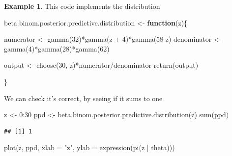 \documentclass[
]{book}
\newenvironment{Shaded}{\begin{snugshade}}{\end{snugshade}}
\newcommand{\AttributeTok}[1]{\textcolor[rgb]{0.77,0.63,0.00}{#1}}
\newcommand{\ControlFlowTok}[1]{\textcolor[rgb]{0.13,0.29,0.53}{\textbf{#1}}}
\newcommand{\DecValTok}[1]{\textcolor[rgb]{0.00,0.00,0.81}{#1}}
\newcommand{\FunctionTok}[1]{\textcolor[rgb]{0.00,0.00,0.00}{#1}}
\newcommand{\NormalTok}[1]{#1}
\newcommand{\OtherTok}[1]{\textcolor[rgb]{0.56,0.35,0.01}{#1}}
\newcommand{\SpecialCharTok}[1]{\textcolor[rgb]{0.00,0.00,0.00}{#1}}
\newcommand{\StringTok}[1]{\textcolor[rgb]{0.31,0.60,0.02}{#1}}
\theoremstyle{definition}
\theoremstyle{definition}
\newtheorem{example}{Example}[chapter]
\theoremstyle{definition}
\theoremstyle{definition}
\theoremstyle{remark}
\begin{document}
\begin{example}
This code implements the distribution

\begin{Shaded}
\begin{Highlighting}[]
\NormalTok{beta.binom.posterior.predictive.distribution }\OtherTok{\textless{}{-}} \ControlFlowTok{function}\NormalTok{(z)\{}
  
  
\NormalTok{  numerator }\OtherTok{\textless{}{-}} \FunctionTok{gamma}\NormalTok{(}\DecValTok{32}\NormalTok{)}\SpecialCharTok{*}\FunctionTok{gamma}\NormalTok{(z }\SpecialCharTok{+} \DecValTok{4}\NormalTok{)}\SpecialCharTok{*}\FunctionTok{gamma}\NormalTok{(}\DecValTok{58}\SpecialCharTok{{-}}\NormalTok{z)}
\NormalTok{  denominator }\OtherTok{\textless{}{-}} \FunctionTok{gamma}\NormalTok{(}\DecValTok{4}\NormalTok{)}\SpecialCharTok{*}\FunctionTok{gamma}\NormalTok{(}\DecValTok{28}\NormalTok{)}\SpecialCharTok{*}\FunctionTok{gamma}\NormalTok{(}\DecValTok{62}\NormalTok{)}
  
\NormalTok{  output }\OtherTok{\textless{}{-}} \FunctionTok{choose}\NormalTok{(}\DecValTok{30}\NormalTok{, z)}\SpecialCharTok{*}\NormalTok{numerator}\SpecialCharTok{/}\NormalTok{denominator}
  \FunctionTok{return}\NormalTok{(output)}
  
\NormalTok{\}}
\end{Highlighting}
\end{Shaded}

We can check it's correct, by seeing if it sums to one

\begin{Shaded}
\begin{Highlighting}[]
\NormalTok{z }\OtherTok{\textless{}{-}} \DecValTok{0}\SpecialCharTok{:}\DecValTok{30}
\NormalTok{ppd }\OtherTok{\textless{}{-}} \FunctionTok{beta.binom.posterior.predictive.distribution}\NormalTok{(z)}
\FunctionTok{sum}\NormalTok{(ppd)}
\end{Highlighting}
\end{Shaded}

\begin{verbatim}
## [1] 1
\end{verbatim}

\begin{Shaded}
\begin{Highlighting}[]
\FunctionTok{plot}\NormalTok{(z, ppd, }\AttributeTok{xlab =} \StringTok{"z"}\NormalTok{, }\AttributeTok{ylab =} \FunctionTok{expression}\NormalTok{(}\FunctionTok{pi}\NormalTok{(z }\SpecialCharTok{|}\NormalTok{ theta)))}
\end{Highlighting}
\end{Shaded}


\end{example}
\end{document}

